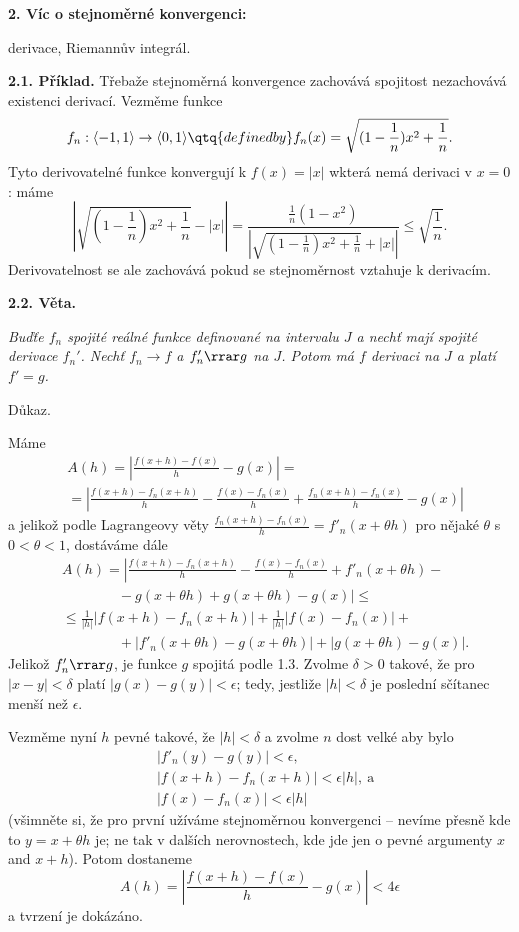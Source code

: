 \documentclass[12pt]{article}
\begin{document}
 
 \vskip10mm
 
 {\large\bf 2. Víc o stejnoměrné konvergenci:
 
 \hskip7mm  derivace, Riemannův integrál.}
 
 \bigskip
 
 {\bf 2.1. Příklad.} Třebaže stejnoměrná konvergence zachovává spojitost nezachovává existenci derivací.  Vezměme funkce
 $$
 f_n:\langle -1,1\rangle \to \langle 0,1\rangle\qtq{defined by} f_n(x)=\sqrt{(1-\frac1n)x^2+\frac1n}.
 $$
 Tyto derivovatelné funkce konvergují k $f(x)=|x|$ wkterá nemá derivaci v $x=0$: máme
 $$
 \left|\sqrt{(1-\frac1n)x^2+\frac1n}-|x|\right|=\frac{\frac1n(1-x^2)}{\left|\sqrt{(1-\frac1n)x^2+\frac1n}+|x|\right|}\leq
 \sqrt{\frac1n}.
 $$
  Derivovatelnost se ale zachovává pokud se stejnoměrnost vztahuje k derivacím. 

 
 \bigskip
 
 {\bf 2.2. Věta.} {\em Buďťe $f_n$ spojité reálné funkce definované na intervalu $J$ a nechť mají spojité derivace
 $f_n'$. Nechť $f_n\to f$ a $f_n'\rrar g$ na $J$. Potom má $f$ derivaci na $J$ a platí $f'=g$.
 
 Důkaz.} Máme
 $$
 \begin{aligned}
 &A(h)=\left|\frac{f(x+h)-f(x)}{h}-g(x)\right|=\\
 &=\left|\frac{f(x+h)-f_n(x+h)}{h}-\frac{f(x)-f_n(x)}{h}+\frac{f_n(x+h)-f_n(x)}{h}-g(x)\right|
 \end{aligned}
 $$
 a jelikož podle Lagrangeovy věty $\frac{f_n(x+h)-f_n(x)}{h}=f'_n(x+\theta h)$ pro nějaké $\theta$ s $0<\theta<1$, dostáváme dále
 $$
 \begin{aligned}
 &A(h)=\left|\frac{f(x+h)-f_n(x+h)}{h}-\frac{f(x)-f_n(x)}{h}+f'_n(x+\theta h)-\right.\\
 &\qquad\qquad-g(x+\theta h)+g(x+\theta h)-g(x)\bigg| \leq\\
 &\leq\frac1{|h|}|f(x+h)-f_n(x+h)|+\frac1{|h|}|f(x)-f_n(x)|+\\
 &\qquad\qquad+|f'_n(x+\theta h)-g(x+\theta h)|+|g(x+\theta h)-g(x)|.
 \end{aligned}
 $$
 Jelikož $f'_n\rrar g$, je funkce $g$ spojitá podle 1.3. Zvolme $\delta>0$ takové, že pro $|x-y|<\delta$ platí
 $|g(x)-g(y)|<\epsilon$; tedy, jestliže  $|h|<\delta$ je poslední sčítanec menší než $\epsilon$.
 
 Vezměme nyní $h$ pevné takové, že $|h|<\delta$ a zvolme  $n$ dost velké aby bylo
 $$
 \begin{aligned}
 &|f'_n(y)-g(y)|<\epsilon,\\
 &|f(x+h)-f_n(x+h)|<\epsilon|h|, \ \text{a}\\
 &|f(x)-f_n(x)|<\epsilon|h|
 \end{aligned}
 $$
 (všimněte si, že pro první užíváme stejnoměrnou konvergenci -- nevíme přesně kde to
 $y=x+\theta h$ je; ne tak v dalších nerovnostech, kde jde jen o pevné argumenty $x$ and $x+h$). Potom dostaneme
 $$
  A(h)=\left|\frac{f(x+h)-f(x)}{h}-g(x)\right|<4\epsilon
  $$
  a tvrzení je dokázáno. \sq
  
\end{document}
